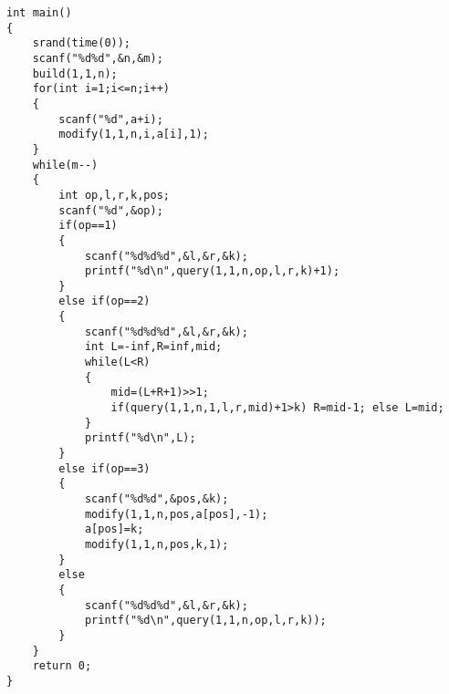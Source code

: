 \begin{lstlisting}
int main()
{
    srand(time(0));
    scanf("%d%d",&n,&m);
    build(1,1,n);
    for(int i=1;i<=n;i++)
    {
        scanf("%d",a+i);
        modify(1,1,n,i,a[i],1);
    }
    while(m--)
    {
        int op,l,r,k,pos;
        scanf("%d",&op);
        if(op==1)
        {
            scanf("%d%d%d",&l,&r,&k);
            printf("%d\n",query(1,1,n,op,l,r,k)+1);
        }
        else if(op==2)
        {
            scanf("%d%d%d",&l,&r,&k);
            int L=-inf,R=inf,mid;
            while(L<R)
            {
                mid=(L+R+1)>>1;
                if(query(1,1,n,1,l,r,mid)+1>k) R=mid-1; else L=mid;
            }
            printf("%d\n",L);
        }
        else if(op==3)
        {
            scanf("%d%d",&pos,&k);
            modify(1,1,n,pos,a[pos],-1);
            a[pos]=k;
            modify(1,1,n,pos,k,1);
        }
        else
        {
            scanf("%d%d%d",&l,&r,&k);
            printf("%d\n",query(1,1,n,op,l,r,k));
        }
    }
    return 0;
}
\end{lstlisting}